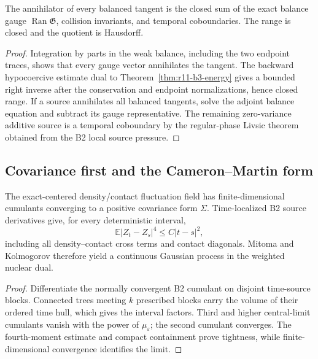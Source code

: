 \begin{theorem}
\label{thm:r11-b3-gauge}
The annihilator of every balanced tangent is the closed sum of the exact
balance gauge $\operatorname{Ran}\mathfrak G$, collision invariants, and
temporal coboundaries.  The range is closed and the quotient is Hausdorff.
\end{theorem}

\begin{proof}
Integration by parts in the weak balance, including the two endpoint traces,
shows that every gauge vector annihilates the tangent.  The backward
hypocoercive estimate dual to Theorem~\ref{thm:r11-b3-energy} gives a bounded
right inverse after the conservation and endpoint normalizations, hence
closed range.  If a source annihilates all balanced tangents, solve the
adjoint balance equation and subtract its gauge representative.  The
remaining zero-variance additive source is a temporal coboundary by the
regular-phase Livsic theorem obtained from the B2 local source pressure.
\end{proof}

\subsection{Covariance first and the Cameron--Martin form}

\begin{theorem}
\label{thm:r11-b3-clt}
The exact-centered density/contact fluctuation field has finite-dimensional
cumulants converging to a positive covariance form $\Sigma$.  Time-localized
B2 source derivatives give, for every deterministic interval,
\[
 \mathbb E|Z_t-Z_s|^4\le C|t-s|^2,
\]
including all density--contact cross terms and contact diagonals.  Mitoma and
Kolmogorov therefore yield a continuous Gaussian process in the weighted
nuclear dual.
\end{theorem}

\begin{proof}
Differentiate the normally convergent B2 cumulant on disjoint time-source
blocks.  Connected trees meeting $k$ prescribed blocks carry the volume of
their ordered time hull, which gives the interval factors.  Third and higher
central-limit cumulants vanish with the power of $\mu_\varepsilon$; the
second cumulant converges.  The fourth-moment estimate and compact containment
prove tightness, while finite-dimensional convergence identifies the limit.
\end{proof}

